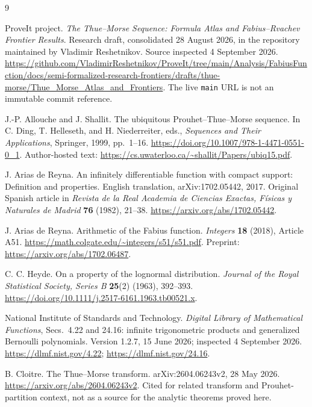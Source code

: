 \documentclass[11pt,a4paper]{article}
\numberwithin{equation}{section}
\theoremstyle{definition}
\begin{document}
\clearpage
\begin{thebibliography}{9}

ProveIt project.
\emph{The Thue--Morse Sequence: Formula Atlas and Fabius--Rvachev
Frontier Results}.
Research draft, consolidated 28 August 2026, in the repository
maintained by Vladimir Reshetnikov. Source inspected 4 September 2026.
\url{https://github.com/VladimirReshetnikov/ProveIt/tree/main/Analysis/FabiusFunction/docs/semi-formalized-research-frontiers/drafts/thue-morse/Thue_Morse_Atlas_and_Frontiers}.
The live \texttt{main} URL is not an immutable commit reference.

J.-P. Allouche and J. Shallit.
The ubiquitous Prouhet--Thue--Morse sequence.
In C. Ding, T. Helleseth, and H. Niederreiter, eds.,
\emph{Sequences and Their Applications}, Springer, 1999, pp.~1--16.
\url{https://doi.org/10.1007/978-1-4471-0551-0_1}.
Author-hosted text:
\url{https://cs.uwaterloo.ca/~shallit/Papers/ubiq15.pdf}.

J. Arias de Reyna.
An infinitely differentiable function with compact support:
Definition and properties.
English translation, arXiv:1702.05442, 2017.
Original Spanish article in \emph{Revista de la Real Academia de
Ciencias Exactas, F\'isicas y Naturales de Madrid} \textbf{76}
(1982), 21--38.
\url{https://arxiv.org/abs/1702.05442}.

J. Arias de Reyna.
Arithmetic of the Fabius function.
\emph{Integers} \textbf{18} (2018), Article A51.
\url{https://math.colgate.edu/~integers/s51/s51.pdf}.
Preprint: \url{https://arxiv.org/abs/1702.06487}.

C. C. Heyde.
On a property of the lognormal distribution.
\emph{Journal of the Royal Statistical Society, Series B}
\textbf{25}(2) (1963), 392--393.
\url{https://doi.org/10.1111/j.2517-6161.1963.tb00521.x}.

National Institute of Standards and Technology.
\emph{Digital Library of Mathematical Functions},
Secs.~4.22 and 24.16: infinite trigonometric products and
generalized Bernoulli polynomials.
Version 1.2.7, 15 June 2026; inspected 4 September 2026.
\url{https://dlmf.nist.gov/4.22};
\url{https://dlmf.nist.gov/24.16}.

B. Cloitre.
The Thue--Morse transform.
arXiv:2604.06243v2, 28 May 2026.
\url{https://arxiv.org/abs/2604.06243v2}.
Cited for related transform and Prouhet-partition context, not as
a source for the analytic theorems proved here.

\end{thebibliography}
\end{document}
